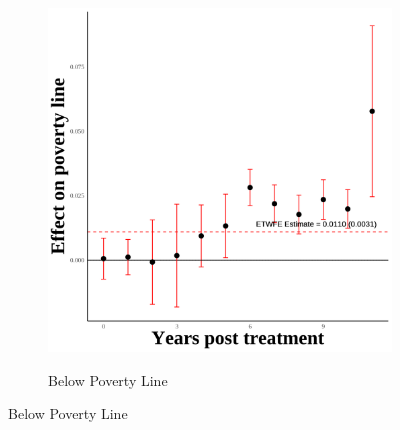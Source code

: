 \documentclass[12pt,english]{article}
\begin{document}
\begin{figure}[H]
\begin{subfigure}[b]{0.3\textwidth}
    \label{fig:snap}
  \end{subfigure}
  \hfill
  \begin{subfigure}[b]{0.3\textwidth}
    \centering
    \caption{Below Poverty Line}
    \includegraphics[width=\linewidth]{figures/plot06-poverty_line_event_study.png}
    \label{fig:poverty-line}
  \end{subfigure}

  \vspace{0.3cm} %


\end{figure}
\end{document}
